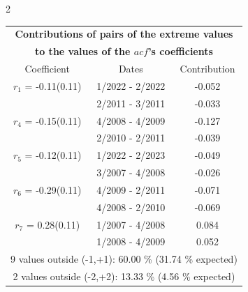 
\thispagestyle{empty}
\begin{multicols}{2}{ 
\begin{tabular}{ccc}
\multicolumn{3}{c}{\textbf{Contributions of pairs of the extreme values} }  \vspace{-.10in}  \\ 
\multicolumn{3}{c}{ \textbf{to the values of the $acf$'s coefficients}} \\ 
\hline 
\hline                  Coefficient  &  Dates &  Contribution \\ 
\hline 
  $r_{ 1}$ = -0.11(0.11) &       1/2022 -  2/2022 &       -0.052    \vspace{-.10in} \\ 
  &        2/2011 -  3/2011 &       -0.033  \vspace{-.02in}   \\ \hline 
    $r_{ 4}$ = -0.15(0.11) &       4/2008 -  4/2009 &       -0.127    \vspace{-.10in} \\ 
  &        2/2010 -  2/2011 &       -0.039  \vspace{-.02in}   \\ \hline 
    $r_{ 5}$ = -0.12(0.11) &       1/2022 -  2/2023 &       -0.049    \vspace{-.10in} \\ 
  &        3/2007 -  4/2008 &       -0.026  \vspace{-.02in}   \\ \hline 
    $r_{ 6}$ = -0.29(0.11) &       4/2009 -  2/2011 &       -0.071    \vspace{-.10in} \\ 
  &        4/2008 -  2/2010 &       -0.069  \vspace{-.02in}   \\ \hline 
    $r_{ 7}$ = 0.28(0.11) &       1/2007 -  4/2008 &        0.084   \vspace{-.10in} \\  
&        1/2008 -  4/2009 &        0.052  \vspace{-.02in} \\ \hline 
\multicolumn{3}{c}{               9 values outside (-1,+1): 60.00  \% (31.74  \% expected)}\vspace{-.10in} \\ 
\multicolumn{3}{c}{               2 values outside (-2,+2): 13.33 \%  (4.56 \% expected) } \\
 \end{tabular} \\ 
 } 
\end{multicols} 
